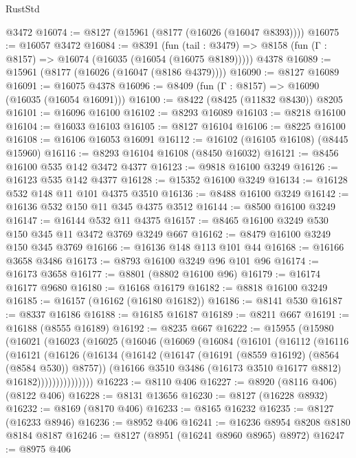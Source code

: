 \begin{lexlean}{RustStd}
\begin{coremodule}
    @3472
@16074 := @8127 (@15961 (@8177 (@16026 (@16047 @8393))))
@16075 := @16057 @3472
@16084 := @8391
    (fun (tail : @3479) => @8158 (fun (Γ : @8157) => @16074 (@16035 (@16054 (@16075 @8189)))))
    @4378
@16089 := @15961 (@8177 (@16026 (@16047 (@8186 @4379))))
@16090 := @8127 @16089
@16091 := @16075 @4378
@16096 := @8409 (fun (Γ : @8157) => @16090 (@16035 (@16054 @16091)))
@16100 := @8422 (@8425 (@11832 @8430)) @8205
@16101 := @16096 @16100
@16102 := @8293 @16089
@16103 := @8218 @16100
@16104 := @16033 @16103
@16105 := @8127 @16104
@16106 := @8225 @16100
@16108 := @16106 @16053 @16091
@16112 := @16102 (@16105 @16108) (@8445 @15960)
@16116 := @8293 @16104 @16108 (@8450 @16032)
@16121 := @8456 @16100 @535 @142 @3472 @4377
@16123 := @9818 @16100 @3249
@16126 := @16123 @535 @142 @4377
@16128 := @15352 @16100 @3249
@16134 := @16128 @532 @148 @11 @101 @4375 @3510
@16136 := @8488 @16100 @3249
@16142 := @16136 @532 @150 @11 @345 @4375 @3512
@16144 := @8500 @16100 @3249
@16147 := @16144 @532 @11 @4375
@16157 := @8465 @16100 @3249 @530 @150 @345 @11 @3472 @3769 @3249 @667
@16162 := @8479 @16100 @3249 @150 @345 @3769
@16166 := @16136 @148 @113 @101 @44
@16168 := @16166 @3658 @3486
@16173 := @8793 @16100 @3249 @96 @101 @96
@16174 := @16173 @3658
@16177 := @8801 (@8802 @16100 @96)
@16179 := @16174 @16177 @9680
@16180 := @16168 @16179
@16182 := @8818 @16100 @3249
@16185 := @16157 (@16162 (@16180 @16182))
@16186 := @8141 @530
@16187 := @8337 @16186
@16188 := @16185 @16187
@16189 := @8211 @667
@16191 := @16188 (@8555 @16189)
@16192 := @8235 @667
@16222 := @15955
    (@15980
      (@16021
        (@16023
          (@16025
            (@16046
              (@16069
                (@16084
                  (@16101
                    (@16112
                      (@16116
                        (@16121
                          (@16126
                            (@16134
                              (@16142
                                (@16147 (@16191 (@8559 @16192) (@8564 (@8584 @530)) @8757))
                                (@16166
                                  @3510
                                  @3486
                                  (@16173 @3510 @16177 @8812)
                                  @16182)))))))))))))))
@16223 := @8110 @406
@16227 := @8920 (@8116 @406) (@8122 @406)
@16228 := @8131 @13656
@16230 := @8127 (@16228 @8932)
@16232 := @8169 (@8170 @406)
@16233 := @8165 @16232
@16235 := @8127 (@16233 @8946)
@16236 := @8952 @406
@16241 := @16236 @8954 @8208 @8180 @8184 @8187
@16246 := @8127 (@8951 (@16241 @8960 @8965) @8972)
@16247 := @8975 @406

\end{coremodule}
\end{lexlean}

